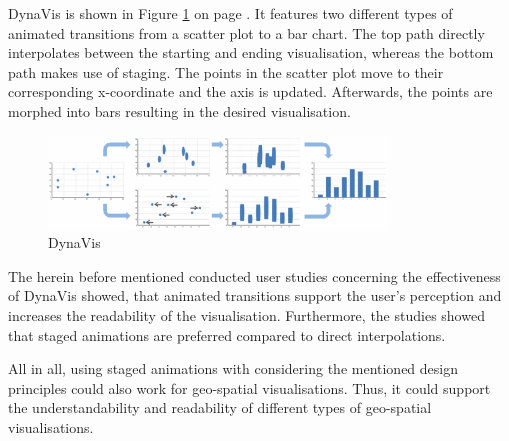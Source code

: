 DynaVis is shown in Figure \ref{fig:dynavis} on page \pageref{fig:dynavis}. It features two different types of animated transitions from a scatter plot to a bar chart. The top path directly interpolates between the starting and ending visualisation, whereas the bottom path makes use of staging. The points in the scatter plot move to their corresponding x-coordinate and the axis is updated. Afterwards, the points are morphed into bars resulting in the desired visualisation.

\begin{figure}[!htb]
\centering
\includegraphics[width=0.8\textwidth, keepaspectratio]{images/methods/related/dynavis.png}
\caption[
    DynaVis 
]{DynaVis}
\label{fig:dynavis}
\end{figure}

The herein before mentioned conducted user studies concerning the effectiveness of DynaVis showed, that animated transitions support the user's perception and increases the readability of the visualisation. Furthermore, the studies showed that staged animations are preferred compared to direct interpolations.

All in all, using staged animations with considering the mentioned design principles could also work for geo-spatial visualisations. Thus, it could support the understandability and readability of different types of geo-spatial visualisations.
\cbend
